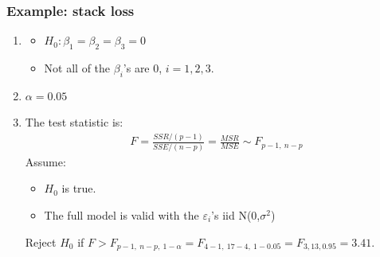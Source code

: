 \documentclass[handout]{beamer}\usepackage[]{graphicx}\usepackage[]{color}
\providecommand{\e}{\varepsilon}
\numberwithin{equation}{section}
\begin{document}
\begin{frame}
\frametitle{Example: stack loss}
\begin{enumerate}[1. ]
\item 
\begin{itemize}
\item $H_0: \beta_1 = \beta_2 = \beta_3 = 0$
\pause \item Not all of the $\beta_i$'s are 0, $i = 1, 2, 3$.
\end{itemize}
\pause \item $\alpha = 0.05$
\pause \item The test statistic is:
\begin{align*}
F = \frac{SSR/(p-1)}{SSE/(n-p)} = \frac{MSR}{MSE}  \sim F_{p - 1, \ n - p}
\end{align*}
\pause Assume:
\begin{itemize}
\pause \item $H_0$ is true.
\pause \item The full model is valid with the $\e_i$'s iid N(0,$\sigma^2$)
\end{itemize}
Reject $H_0$ if $F > F_{p - 1,\ n - p,\ 1 - \alpha} = F_{4 - 1,\ 17 - 4,\ 1 - 0.05}  = F_{3, 13, 0.95} = 3.41$.
\end{enumerate}
\end{frame}
\end{document}
